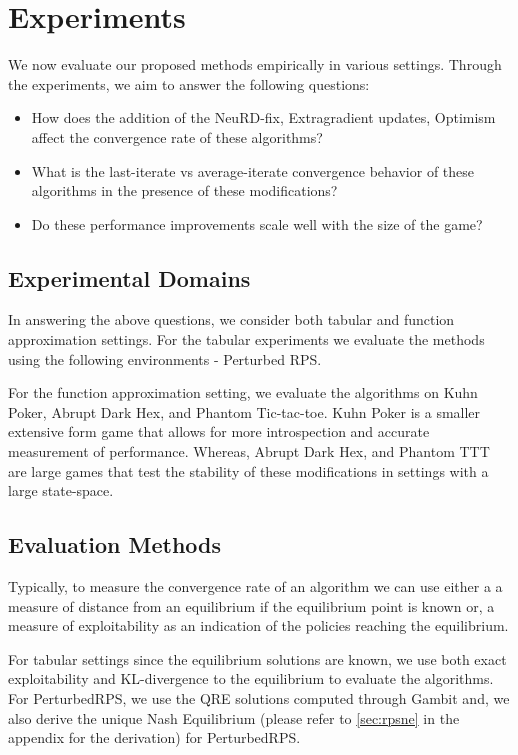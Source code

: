 \chapter{Experiments}

We now evaluate our proposed methods empirically in various settings.
Through the experiments, we aim to answer the following questions:

\begin{itemize}
	\item How does the addition of the NeuRD-fix, Extragradient updates, Optimism
	      affect the convergence rate of these algorithms?
	\item What is the last-iterate vs average-iterate convergence behavior of these algorithms in the presence of these modifications?
	\item Do these performance improvements scale well with the size of the game?
\end{itemize}

\section{Experimental Domains}
In answering the above questions, we consider both tabular and function approximation settings.
For the tabular experiments we evaluate the methods using the following environments - Perturbed
RPS.

For the function approximation setting, we evaluate the algorithms on Kuhn Poker, Abrupt Dark Hex,
and Phantom Tic-tac-toe.
Kuhn Poker is a smaller extensive form game that allows for more introspection and accurate
measurement of performance.
Whereas, Abrupt Dark Hex, and Phantom TTT are large games that test the stability of these
modifications in settings with a large state-space.

\section{Evaluation Methods}

Typically, to measure the convergence rate of an algorithm we can use either a a measure of
distance from an equilibrium if the equilibrium point is known or, a measure of exploitability as
an indication of the policies reaching the equilibrium.

For tabular settings since the equilibrium solutions are known, we use both exact exploitability
and KL-divergence to the equilibrium to evaluate the algorithms.
For PerturbedRPS, we use the QRE solutions computed through Gambit and, we also derive the unique
Nash Equilibrium (please refer to \ref{sec:rpsne} in the appendix for the derivation) for
PerturbedRPS.

